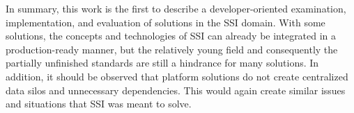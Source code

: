 In summary, this work is the first to describe a developer-oriented examination, implementation, and evaluation of solutions in the \ac{SSI} domain. With some solutions, the concepts and technologies of \ac{SSI} can already be integrated in a production-ready manner, but the relatively young field and consequently the partially unfinished standards are still a hindrance for many solutions. In addition, it should be observed that platform solutions do not create centralized data silos and unnecessary dependencies. This would again create similar issues and situations that \ac{SSI} was meant to solve.



